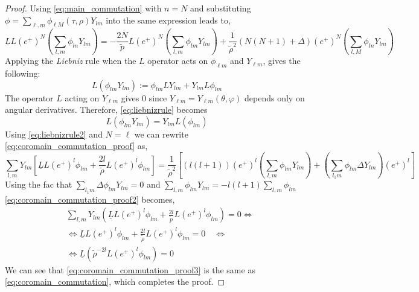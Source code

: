 \begin{proof}
  Using \eqref{eq:main_commutation} with $n = N$ and substituting $\phi=\sum_{\ell, m} \phi_{\ell M}(\tau, \rho) Y_{l m}$ into the same expression leads to,
  \begin{equation}\label{eq:coromain_commutation_proof}
    \underline{L} L\left(e^{+}\right)^{N}\left(\sum_{l, m} \phi_{l n} Y_{l m}\right)=-\frac{2 N}{\tilde{p}} L\left(e^{+}\right)^{N}\left(\sum_{l, m} \phi_{l m} Y_{l m}\right)+\frac{1}{\tilde{\rho}^{2}}(N(N+1)+\Delta)\left(e^{+}\right)^{N}\left(\sum_{l, M} \phi_{l n} Y_{l m}\right)
  \end{equation}
  Applying the \textit{Liebniz} rule when the $L$ operator acts on $\phi_{\ell m}$ and $Y_{\ell m}$, gives the following:
  \begin{equation}\label{eq:liebnizrule}
    L\left(\phi_{l m} Y_{l m}\right):=\phi_{l m} L Y_{l m}+Y_{l m} L \phi_{l m}
  \end{equation}
  The operator $L$ acting on $Y_{\ell m}$ gives $0$ since $Y_{\ell m} = Y_{\ell m}(\theta, \varphi)$ depends only on angular derivatives. Therefore, \eqref{eq:liebnizrule} becomes
  \begin{equation}\label{eq:liebnizrule2}
    L\left(\phi_{l m} Y_{l m}\right)=Y_{l m} L (\phi_{l m})
  \end{equation}
  Using \eqref{eq:liebnizrule2} and $N = \ell$ we can rewrite \eqref{eq:coromain_commutation_proof} as,
  \begin{equation}\label{eq:coromain_commutation_proof2}
    \sum_{l, m} Y_{l m}\left[\underline{L} L\left(e^{+}\right)^{l} \phi_{l m}+\frac{2l}{\tilde{\rho}} L\left(e^{+}\right)^{l} \phi_{l m}\right]=\frac{1}{\tilde{\rho}^{2}}\left[(l(l+1))\left(e^{+}\right)^{l}\left(\sum_{l, m} \phi_{l m} Y_{l m}\right) +\left(\sum_{l_{1} m} \phi_{l m} \Delta Y_{l m}\right)\left(e^{+}\right)^{l}\right]
  \end{equation}
  Using the fac that $\sum_{l_{1} m} \Delta \phi_{l m} Y_{l m}=0$ and $\sum_{l, m} \phi_{l m} Y_{l m}=-l(l+1) \sum_{l, m} \phi_{l m}$ \eqref{eq:coromain_commutation_proof2} becomes,
  \begin{align}\label{eq:coromain_commutation_proof3}
    & \sum_{l, m} Y_{l m}\left(\underline{L} L\left(e^{+}\right)^{l} \phi_{l m}+\frac{2 l}{\tilde{p}} L\left(e^{+}\right)^{l} \phi_{l m}\right)=0 \Leftrightarrow \nonumber \\
    & \Leftrightarrow \underline{L} L\left(e^{+}\right)^{l} \phi_{l m}+\frac{2 l}{\tilde{\rho}} L\left(e^{+}\right)^{l} \phi_{l m}=0 \quad \Leftrightarrow \nonumber \\
    & \Leftrightarrow \underline{L}\left(\tilde{\rho}^{-2 l} L\left(e^{+}\right)^{l} \phi_{l m}\right)=0
  \end{align}
  We can see that \eqref{eq:coromain_commutation_proof3} is the same as \eqref{eq:coromain_commutation}, which completes the proof.   
\end{proof}

